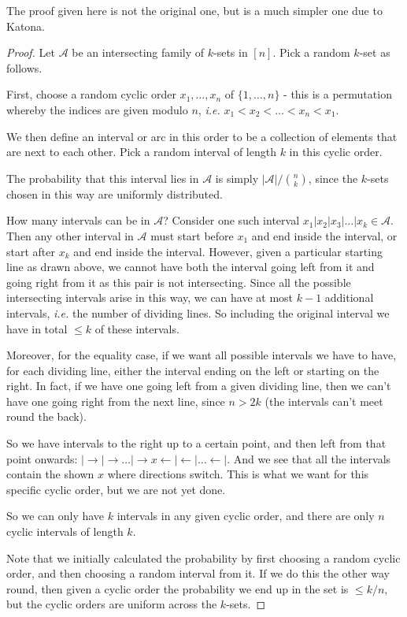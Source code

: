 \documentclass[]{article}
\theoremstyle{custhm}
\theoremstyle{cusdef}
\theoremstyle{custhm}
\theoremstyle{custhm}
\theoremstyle{custhm}
\theoremstyle{custhm}
\theoremstyle{cusdef}
\theoremstyle{remark}
\theoremstyle{custhm}
\newcommand{\ra}{\rightarrow}
\newcommand{\ie}{\textit{i.e. }}
\newcommand{\A}{\mathcal{A}}
\begin{document}
The proof given here is not the original one, but is a much simpler one due to Katona.

\begin{proof}
Let $\A$ be an intersecting family of $k$-sets in $[n]$. Pick a random $k$-set as follows.

First, choose a random cyclic order $x_1,\dots,x_n$ of $\{1,\dots,n\}$ - this is a permutation whereby the indices are given modulo $n$, \ie$x_1 < x_2 < \dots < x_n < x_1$.

We then define an interval or arc in this order to be a collection of elements that are next to each other. Pick a random interval of length $k$ in this cyclic order.

The probability that this interval lies in $\A$ is simply $|\A|/{n\choose k}$, since the $k$-sets chosen in this way are uniformly distributed.

 How many intervals can be in $\A$? Consider one such interval $x_1|x_2|x_3|\dots|x_k \in \A$. Then any other interval in $\A$ must start before $x_1$ and end inside the interval, or start after $x_k$ and end inside the interval. However, given a particular starting line as drawn above, we cannot have both the interval going left from it and going right from it as this pair is not intersecting. Since all the possible intersecting intervals arise in this way, we can have at most $k-1$ additional intervals, \ie the number of dividing lines. So including the original interval we have in total $\le k$ of these intervals.

Moreover, for the equality case, if we want all possible intervals we have to have, for each dividing line, either the interval ending on the left or starting on the right. In fact, if we have one going left from a given dividing line, then we can't have one going right from the next line, since $n > 2k$ (the intervals can't meet round the back).

So we have intervals to the right up to a certain point, and then left from that point onwards: $|\ra|\ra\dots |\ra x \leftarrow |\leftarrow|\dots\leftarrow |$. And we see that all the intervals contain the shown $x$ where directions switch. This is what we want for this specific cyclic order, but we are not yet done.

So we can only have $k$ intervals in any given cyclic order, and there are only $n$ cyclic intervals of length $k$.

Note that we initially calculated the probability by first choosing a random cyclic order, and then choosing a random interval from it. If we do this the other way round, then given a cyclic order the probability we end up in the set is $\le k /n$, but the cyclic orders are uniform across the $k$-sets.


\end{proof}
\end{document}
